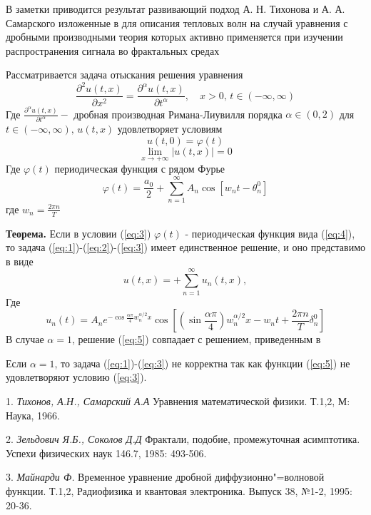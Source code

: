 
\vzmscaption

В заметки приводится результат развивающий подход А. Н. Тихонова и А. А. Самарского изложенные в \cite{tehonov} для описания тепловых волн на случай уравнения с дробными производными теория которых активно применяется при изучении распространения сигнала во фрактальных средах 

Рассматривается задача отыскания решения уравнения
\begin{equation}\label{eq:1}
	\frac{\partial ^2 u(t,x)}{\partial x^2}= \frac{\partial ^{\alpha} u(t,x)}{\partial t^{\alpha}},\quad x> 0,\, t\in (-\infty, \infty)
\end{equation}
Где $\frac{\partial ^{\alpha} u(t,x)}{\partial t^{\alpha}}-$ дробная производная Римана-Лиувилля порядка $\alpha \in (0,2)$ для $t\in (-\infty, \infty),\, u(t,x)$ удовлетворяет условиям
	\begin{equation}\label{eq:2}
u(t,0)=\varphi(t) 
\end{equation}
	\begin{equation}\label{eq:3}
	\lim\limits_{x\to + \infty } |u(t,x)|=0
\end{equation}
Где $\varphi(t)$ периодическая функция с рядом Фурье
	\begin{equation}\label{eq:4}
	\varphi(t) =\frac{a_0}{2}+ \sum_{n=1}^{\infty}A_n \cos \left[ w_{n}t - \theta_{n}^{0} \right]
\end{equation}
где $w_{n}= \frac{2\pi n}{T}$

\textbf{Теорема.} Если в условии (\ref{eq:3}) $\varphi(t)$ - периодическая функция вида (\ref{eq:4}), то задача (\ref{eq:1})-(\ref{eq:2})-(\ref{eq:3}) имеет единственное решение, и оно представимо в виде
	\begin{equation}\label{eq:5}
	u(t,x)=+ \sum_{n=1}^{\infty}u_{n}(t,x),
\end{equation}
Где
\begin{equation*}
	u_n(t)= A_n e^{-\cos\frac{\alpha \pi}{4}w_n^{\alpha/2}x}\cos \left[(\sin \frac{\alpha \pi}{4})w_n^{\alpha/2}x - w_nt +\frac{2\pi n}{T}\delta_n^0 \right]
\end{equation*}
В случае $\alpha =1$, решение (\ref{eq:5}) совпадает с решением, приведенным в \cite{tehonov} 

Если $\alpha =1$, то задача (\ref{eq:1})-(\ref{eq:3}) не корректна так как функции (\ref{eq:5}) не удовлетворяют условию (\ref{eq:3}).

\litlist

1. {\it Тихонов, А.Н., Самарский А.А}
Уравнения математической физики. Т.1,2, М: Наука, 1966.

2. {\it Зельдович Я.Б., Соколов Д.Д}
Фрактали, подобие, промежуточная асимптотика. Успехи физических наук 146.7, 1985: 493-506.

3. {\it Майнарди Ф.}
Временное уравнение дробной диффузионно"=волновой функции. Т.1,2, Радиофизика и квантовая электроника. Выпуск 38, №1-2, 1995: 20-36.
